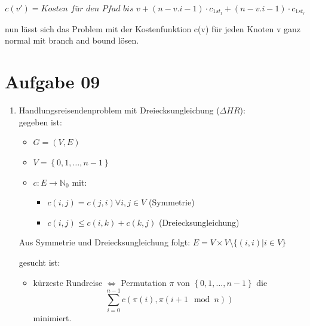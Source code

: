 \documentclass[10pt,a4paper]{article}
\begin{document}
    $$
        c(v') = \textit{Kosten für den Pfad bis v} + (n-v.i-1) \cdot c_{1st_l} + (n-v.i-1) \cdot c_{1st_r}
    $$

    nun l\"asst sich das Problem mit der Kostenfunktion c(v) f\"ur jeden
    Knoten v ganz normal mit branch and bound l\"osen.




\section*{Aufgabe 09}
    \begin{enumerate}[label={\alph*)}]
        \item Handlungsreisendenproblem mit Dreiecksungleichung ($\Delta HR$): \\
            gegeben ist:
            \begin{itemize}
                \item $G = (V,E)$
                \item $V = \left\{0,1,\ldots, n-1\right\}$
                \item $c: E \rightarrow \mathbb{N}_0 $ mit:
                    \begin{itemize}
                        \item $c(i,j) = c(j,i) \forall i,j \in V$ (Symmetrie)
                        \item $c(i,j) \leq c(i,k) + c(k,j)$ (Dreiecksungleichung)
                    \end{itemize}

            \end{itemize}

            Aus Symmetrie und Dreiecksungleichung folgt: $E = V \times V
            \setminus \{ (i,i) | i \in V \} $

            gesucht ist:
            \begin{itemize}
                \item kürzeste Rundreise $\Leftrightarrow$
                    Permutation $\pi$ von $\left\{0,1,\ldots, n-1\right\}$ die
                    $$
                        \sum_{i=0}^{n-1} c(\pi(i), \pi(i+1 \mod n))
                    $$
                    minimiert.
            \end{itemize}


\end{enumerate}
\end{document}

